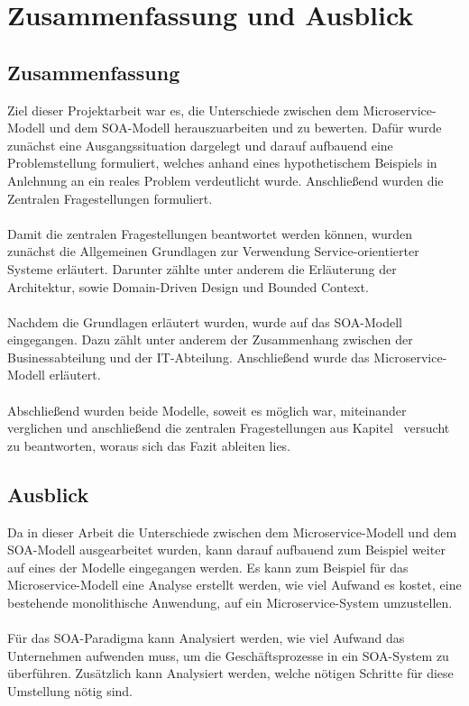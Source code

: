 \chapter{Zusammenfassung und Ausblick}
\label{chap:ZusammenfassungUndAusblick}

\section{Zusammenfassung}
\label{sec:Zusammenfassung}
Ziel dieser Projektarbeit war es, die Unterschiede zwischen dem Microservice-Modell und dem SOA-Modell herauszuarbeiten und zu bewerten. Dafür wurde zunächst eine Ausgangssituation dargelegt und darauf aufbauend eine Problemstellung formuliert, welches anhand eines hypothetischem Beispiels in Anlehnung an ein reales Problem verdeutlicht wurde. Anschließend wurden die Zentralen Fragestellungen formuliert.
\\\\
Damit die zentralen Fragestellungen beantwortet werden können, wurden zunächst die Allgemeinen Grundlagen zur Verwendung Service-orientierter Systeme erläutert. Darunter zählte unter anderem die Erläuterung der Architektur, sowie Domain-Driven Design und Bounded Context.
\\\\
Nachdem die Grundlagen erläutert wurden, wurde auf das SOA-Modell eingegangen. Dazu zählt unter anderem der Zusammenhang zwischen der Businessabteilung und der IT-Abteilung. Anschließend wurde das Microservice-Modell erläutert.
\\\\
Abschließend wurden beide Modelle, soweit es möglich war, miteinander verglichen und anschließend die zentralen Fragestellungen aus Kapitel \ versucht zu beantworten, woraus sich das Fazit ableiten lies.

\section{Ausblick}
\label{sec:Ausblick}
Da in dieser Arbeit die Unterschiede zwischen dem Microservice-Modell und dem SOA-Modell ausgearbeitet wurden, kann darauf aufbauend zum Beispiel weiter auf eines der Modelle eingegangen werden. Es kann zum Beispiel für das Microservice-Modell eine Analyse erstellt werden, wie viel Aufwand es kostet, eine bestehende monolithische Anwendung, auf ein Microservice-System umzustellen.
\\\\
Für das SOA-Paradigma kann Analysiert werden, wie viel Aufwand das Unternehmen aufwenden muss, um die Geschäftsprozesse in ein SOA-System zu überführen. Zusätzlich kann Analysiert werden, welche nötigen Schritte für diese Umstellung nötig sind.